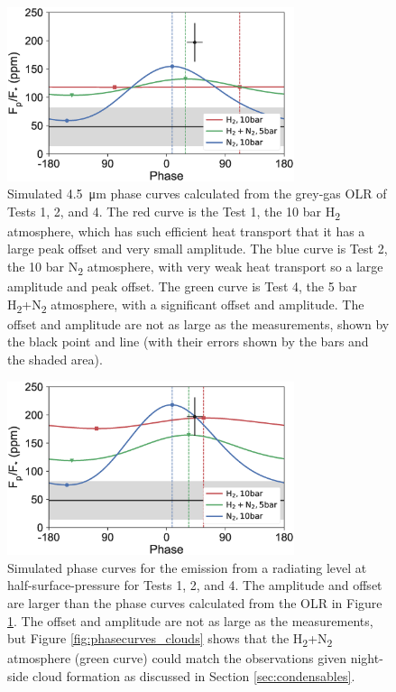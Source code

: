 \begin{figure}
  \centering
\includegraphics[width=0.75\textwidth]{figures/linking-climate-55cnce/phasecurves_flux.eps}
\caption{Simulated \SI{4.5}{\micro\metre} phase curves calculated from the grey-gas OLR of Tests 1, 2, and 4. The red curve is the Test 1, the 10 bar H\textsubscript{2} atmosphere, which has such efficient heat transport that it has a large peak offset and very small amplitude. The blue curve is Test 2, the 10 bar N\textsubscript{2} atmosphere, with very weak heat transport so a large amplitude and peak offset. The green curve is Test 4, the 5 bar H\textsubscript{2}+N\textsubscript{2} atmosphere, with a significant offset and amplitude. The offset and amplitude are not as large as the \citet{demory201655cnce} measurements, shown by the black point and line (with their errors shown by the bars and the shaded area).\label{fig:phasecurves_flux}}
\end{figure}

\begin{figure}
  \centering
\includegraphics[width=0.75\textwidth]{figures/linking-climate-55cnce/phasecurves_temp.eps}
\caption{Simulated phase curves for the emission from a radiating level at half-surface-pressure for Tests 1, 2, and 4. The amplitude and offset are larger than the phase curves calculated from the OLR in Figure \ref{fig:phasecurves_flux}. The offset and amplitude are not as large as the \citet{demory201655cnce} measurements, but Figure \ref{fig:phasecurves_clouds} shows that the H\textsubscript{2}+N\textsubscript{2} atmosphere (green curve) could match the observations given night-side cloud formation as discussed in Section \ref{sec:condensables}.\label{fig:phasecurves_temp}}
\end{figure}

